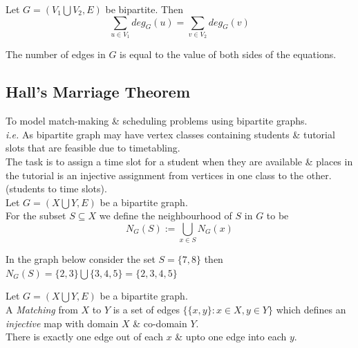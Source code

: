 \documentclass[11pt,a4paper]{article}
\begin{document}
Let $G=(V_1\bigcup V_2,E)$ be bipartite. Then
$$\sum_{u\in V_1}deg_G(u)=\sum_{v\in V_2}deg_G(v)$$

The number of edges in $G$ is equal to the value of both sides of the equations.\\

\subsection{Hall's Marriage Theorem}

To model match-making \& scheduling problems using bipartite graphs.\\
\textit{i.e.} As bipartite graph may have vertex classes containing students \& tutorial slots that are feasible due to timetabling.\\
The task is to assign a time slot for a student when they are available \& places in the tutorial is an injective assignment from vertices in one class to the other. (students to time slots).\\

Let $G=(X\bigcup Y,E)$ be a bipartite graph.\\
For the subset $S\subseteq X$ we define the neighbourhood of $S$ in $G$ to be
$$N_G(S):=\bigcup\limits_{x\in S}N_G(x)$$

In the graph below consider the set $S=\{7,8\}$ then $N_G(S)=\{2,3\}\bigcup\{3,4,5\}=\{2,3,4,5\}$\\

Let $G=(X\bigcup Y,E)$ be a bipartite graph.\\
A \textit{Matching} from $X$ to $Y$ is a set of edges $\{\{x,y\}:x\in X, y\in Y\}$ which defines an \textit{injective} map with domain $X$ \& co-domain $Y$.\\
\nb There is exactly one edge out of each $x$ \& upto one edge into each $y$.\\
\end{document}

